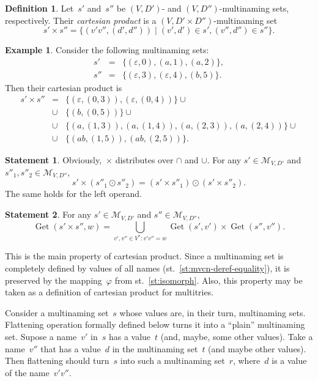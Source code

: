 \documentclass{article}
\theoremstyle{definition}
\newtheorem{Df}{Definition}
\newtheorem{St}{Statement}
\newtheorem{Ex}{Example}
\newcommand{\setcharmvcn}{M}
\newcommand{\setsymbol}[3]{\mathcal{#1}_{#2,#3}}
\newcommand{\setmvcn}[2]{\setsymbol{\setcharmvcn}{#1}{#2}}
\newcommand{\deref}{\operatorname{Get}}
\begin{document}
\begin{Df}\label{df:mvcn-cartesian}
Let~$s'$ and~$s''$ be $(V,D')$- and $(V,D'')$-multinaming sets, respectively. Their
\emph{cartesian product} is a $(V,D'\times D'')$-multinaming set
\[
  s'\times s'' = \{ (v' v'', (d',d'')) \mid (v',d')\in s', (v'',d'')\in s'' \} .
\]
\end{Df}

\begin{Ex}\label{ex:cartesian}
Consider the following multinaming sets:
\begin{eqnarray*}
  s'  & = & \{ (\varepsilon, 0), (a, 1), (a, 2) \} , \\
  s'' & = & \{ (\varepsilon, 3), (\varepsilon, 4), (b, 5) \} .
\end{eqnarray*}
Then their cartesian product is
\begin{eqnarray*}
  s' \times s'' & = &  \{ (\varepsilon, (0, 3)), (\varepsilon, (0, 4)) \} \cup \\
    & \cup & \{ (b, (0, 5)) \} \cup \\
    & \cup & \{ (a, (1, 3)), (a, (1, 4)), (a, (2, 3)), (a, (2, 4)) \} \cup \\
    & \cup & \{ (ab, (1, 5)), (ab, (2, 5)) \} .
\end{eqnarray*}
\end{Ex}

\begin{St}\label{st:cartesian-distributivity}
Obviously,~$\times$ distributes over $\cap$ and $\cup$.
For any $s' \in \setmvcn{V}{D'}$ and $s''_1, s''_2 \in \setmvcn{V}{D''}$,
\[
  s'\times(s''_1\odot s''_2) = (s'\times s''_1) \odot (s'\times s''_2) .
\]
The same holds for the left operand.
\end{St}

\begin{St}\label{st:deref-cartesian}
For any $s' \in \setmvcn{V}{D'}$ and $s'' \in \setmvcn{V}{D''}$,
\[
  \deref(s' \times s'', w) =
      \bigcup_{v',v''\in V^\ast: v' v'' = w}
          \deref(s', v')
          \times
          \deref(s'', v'') .
\]
\end{St}

This is the main property of cartesian product. Since a multinaming set is
completely defined by values of all names (st.~\ref{st:mvcn-deref-equality}),
it is preserved by the mapping~$\varphi$ from st.~\ref{st:isomorph}. Also, this
property may be taken as a definition of cartesian product for multitries.

Consider a multinaming set~$s$ whose values are, in their turn, multinaming
sets.  Flattening operation formally defined below turns it into a ``plain''
multinaming set.  Supose a name~$v'$ in~$s$ has a value~$t$ (and, maybe, some
other values).  Take a name~$v''$ that has a value~$d$ in the multinaming set~$t$
(and maybe other values).  Then flattening should turn~$s$ into such a
multinaming set~$r$, where~$d$ is a value of the name~$v'v''$.
\end{document}
